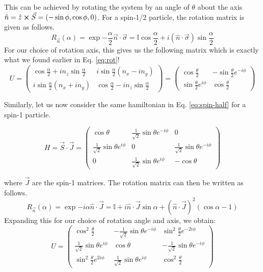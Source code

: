 This can be achieved by rotating the system by an angle of $\theta$ about the axis $\hat{n} = \hat{z} \cross \vec{S} =  (-\sin\phi, \cos\phi, 0)$. For a spin-1/2 particle, the rotation matrix is given as follows.
\begin{equation}
    R_{\vec{n}}(\alpha) = \exp{-\frac{\alpha}{2}\vec{n}\cdot\vec{\sigma}} = \mathbb{I}\cos\frac{\alpha}{2} + i (\hat{n}\cdot \vec{\sigma})\sin\frac{\alpha}{2}
\end{equation}
For our choice of rotation axis, this gives us the following matrix which is exactly what we found earlier in Eq. \eqref{eq:rot}!
\begin{equation}
    U = \begin{pmatrix}
        \cos\frac{\alpha}{2} + in_z\sin\frac{\alpha}{2} & i\sin\frac{\alpha}{2}(n_x - in_y) \\ 
        i\sin\frac{\alpha}{2}(n_x + in_y) & \cos\frac{\alpha}{2} - in_z\sin\frac{\alpha}{2}
    \end{pmatrix} =
    \begin{pmatrix}
        \cos\frac{\theta}{2} & -\sin\frac{\theta}{2}e^{-i\phi} \\ 
        \sin\frac{\theta}{2}e^{i\phi} & \cos\frac{\theta}{2}
    \end{pmatrix}
\end{equation}

Similarly, let us now consider the same hamiltonian in Eq. \ref{eq:spin-half} for a spin-1 particle.

\begin{equation}\label{eq:spin-one}
    H = \vec{S} \cdot \vec{J} = \begin{pmatrix}
        \cos\theta & \frac{1}{\sqrt{2}}\sin\theta e^{-i\phi} & 0 \\
        \frac{1}{\sqrt{2}}\sin\theta e^{i\phi} & 0 & \frac{1}{\sqrt{2}}\sin\theta e^{-i\phi} \\ 
        0 & \frac{1}{\sqrt{2}}\sin\theta e^{i\phi} & -\cos\theta
    \end{pmatrix}
\end{equation}

where $\vec{J}$ are the spin-1 matrices. The rotation matrix can then be written as follows\cite{Curtright_2014}.
\begin{equation}
    R_{\vec{n}}(\alpha) = \exp{-i\alpha \hat{n}\cdot\vec{J}} = \mathbb{I} + i\hat{n}\cdot\vec{J}\sin\alpha + (\hat{n}\cdot\vec{J})^2 (\cos\alpha - 1)
\end{equation}
Expanding this for our choice of rotation angle and axis, we obtain:
\begin{equation}
    U = \begin{pmatrix}
        \cos^2\frac{\theta}{2} & -\frac{1}{\sqrt{2}}\sin\theta e^{-i\phi} & \sin^2\frac{\theta}{2} e^{-2i\phi} \\
        \frac{1}{\sqrt{2}}\sin\theta e^{i\phi} & \cos\theta &-\frac{1}{\sqrt{2}}\sin\theta e^{-i\phi}\\
        \sin^2\frac{\theta}{2}e^{2i\phi} & \frac{1}{\sqrt{2}}\sin\theta e^{i\phi} & \cos^2\frac{\theta}{2}
    \end{pmatrix}
\end{equation}

